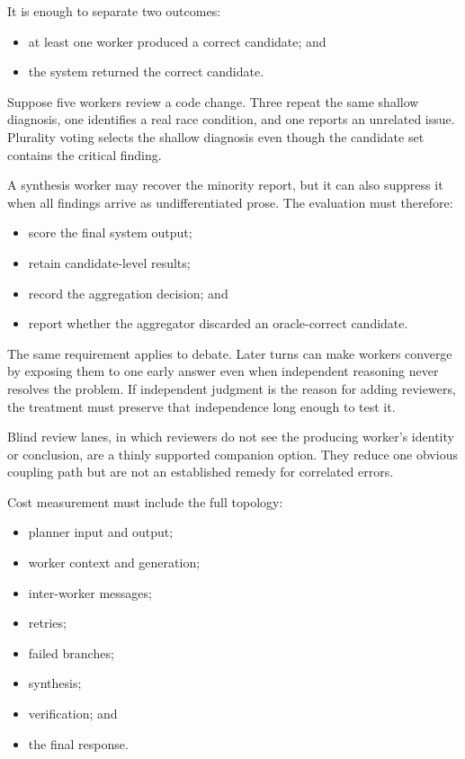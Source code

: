 
It is enough to separate two outcomes:

\begin{itemize}
\tightlist
\item
  at least one worker produced a correct candidate; and
\item
  the system returned the correct candidate.
\end{itemize}

Suppose five workers review a code change. Three repeat the same shallow diagnosis, one identifies a real race condition, and one reports an unrelated issue. Plurality voting selects the shallow diagnosis even though the candidate set contains the critical finding.


A synthesis worker may recover the minority report, but it can also suppress it when all findings arrive as undifferentiated prose. The evaluation must therefore:

\begin{itemize}
\tightlist
\item
  score the final system output;
\item
  retain candidate-level results;
\item
  record the aggregation decision; and
\item
  report whether the aggregator discarded an oracle-correct candidate.
\end{itemize}

The same requirement applies to debate. Later turns can make workers converge by exposing them to one early answer even when independent reasoning never resolves the problem. If independent judgment is the reason for adding reviewers, the treatment must preserve that independence long enough to test it.

Blind review lanes, in which reviewers do not see the producing worker's identity or conclusion, are a thinly supported companion option. They reduce one obvious coupling path but are not an established remedy for correlated errors.


Cost measurement must include the full topology:

\begin{itemize}
\tightlist
\item
  planner input and output;
\item
  worker context and generation;
\item
  inter-worker messages;
\item
  retries;
\item
  failed branches;
\item
  synthesis;
\item
  verification; and
\item
  the final response.
\end{itemize}

